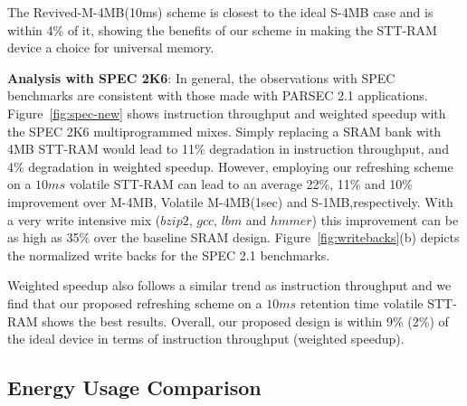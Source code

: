 The Revived-M-4MB(10ms) scheme is closest to the ideal S-4MB case and is within 4\% of it, showing the benefits of our scheme in making the STT-RAM device a choice for universal memory.

\begin{figure*} [t]
\centering
 \caption{\label{fig:spec-new} Normalized Average Instruction Throughput(IT) and Weighted Speedup(WS) for SPEC 2K6 multiprogrammed mixes. }
\end{figure*}

{\bf Analysis with SPEC 2K6}: In general, the observations with SPEC benchmarks are consistent with those made with PARSEC 2.1 applications. Figure~\ref{fig:spec-new} shows instruction throughput and weighted speedup with the  SPEC 2K6 multiprogrammed
mixes. Simply replacing a SRAM bank with 4MB STT-RAM would lead to 11\% degradation in instruction throughput, and 4\% degradation in weighted speedup. However, employing our refreshing scheme on a $10ms$ volatile STT-RAM can lead to an average 22\%, 11\%  and 10\% improvement over M-4MB, Volatile M-4MB(1sec) and S-1MB,respectively. With a very write intensive mix ($bzip2$, $gcc$, $lbm$ and $hmmer$) this improvement can be as high as 35\% over the baseline SRAM design. Figure~\ref{fig:writebacks}(b) depicts the normalized write backs for
the SPEC 2.1 benchmarks.


Weighted speedup also follows a similar trend as instruction throughput and we find that our proposed refreshing scheme on a $10ms$ retention time volatile STT-RAM shows the best results. Overall, our proposed design is within 9\% (2\%) of the ideal device in terms of instruction throughput (weighted speedup).

\subsection{Energy Usage Comparison}

